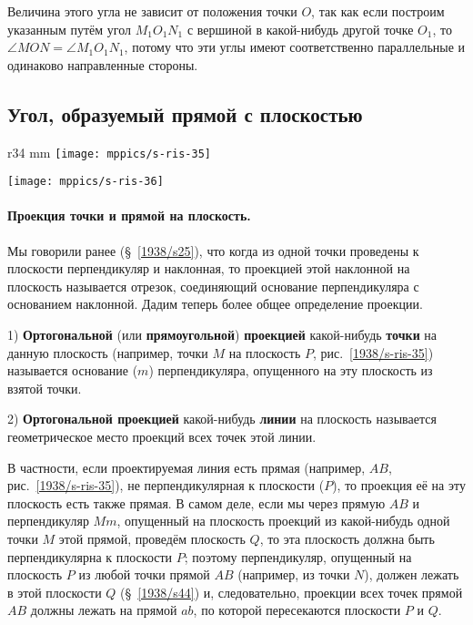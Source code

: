 Величина этого угла не зависит от положения точки $O$, так как если построим указанным путём угол $M_1O_1N_1$ с вершиной в какой-нибудь другой точке $O_1$, то $\angle MON = \angle M_1O_1N_1$, потому что эти углы имеют соответственно параллельные и одинаково направленные стороны.

\subsection*{Угол, образуемый прямой с плоскостью}

\begin{wrapfigure}{r}{34 mm}
\vskip-6mm
\centering
\texttt{[image: mppics/s-ris-35]}
\caption{}\label{1938/s-ris-35}
\bigskip
\texttt{[image: mppics/s-ris-36]}
\caption{}\label{1938/s-ris-36}
\end{wrapfigure}

\paragraph{Проекция точки и прямой на плоскость.}\label{1938/s47}
Мы говорили ранее (§~\ref{1938/s25}), что когда из одной точки проведены к плоскости перпендикуляр и наклонная, то проекцией этой наклонной на плоскость называется отрезок, соединяющий основание перпендикуляра с основанием наклонной.
Дадим теперь более общее определение проекции.

1) \textbf{Ортогональной} (или \textbf{прямоугольной}) \textbf{проекцией} какой-нибудь \textbf{точки} на данную плоскость (например, точки $M$ на плоскость $P$, рис.~\ref{1938/s-ris-35}) называется основание ($m$) перпендикуляра, опущенного на эту плоскость из взятой точки.

2) \textbf{Ортогональной проекцией} какой-нибудь \textbf{линии} на плоскость называется геометрическое место проекций всех точек этой линии.

В частности, если проектируемая линия есть прямая (например, $AB$, рис.~\ref{1938/s-ris-35}), не перпендикулярная к плоскости ($P$), то проекция её на эту плоскость есть также прямая.
В самом деле, если мы через прямую $AB$ и перпендикуляр $Mm$, опущенный на плоскость проекций из какой-нибудь одной точки $M$ этой прямой, проведём плоскость $Q$, то эта плоскость должна быть перпендикулярна к плоскости $P$;
поэтому перпендикуляр, опущенный на плоскость $P$ из любой точки прямой $AB$ (например, из точки $N$), должен лежать в этой плоскости $Q$ (§~\ref{1938/s44}) и, следовательно, проекции всех точек прямой $AB$ должны лежать на прямой $ab$, по которой пересекаются плоскости $P$ и $Q$.

